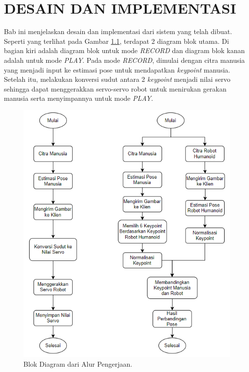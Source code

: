 \chapter{DESAIN DAN IMPLEMENTASI}
\label{chap:design-and-implementation}


Bab ini menjelaskan desain dan implementasi dari sistem yang telah dibuat.
Seperti yang terlihat pada Gambar \ref{fig:block-diagram}, terdapat 2 diagram blok utama. Di bagian kiri adalah diagram blok untuk mode \textit{RECORD} dan diagram blok kanan adalah untuk mode \textit{PLAY}.
Pada mode \textit{RECORD}, dimulai dengan citra manusia yang menjadi input ke estimasi pose untuk mendapatkan \textit{keypoint} manusia.
Setelah itu, melakukan konversi sudut antara 2 \textit{keypoint} menjadi nilai servo sehingga dapat menggerakkan servo-servo robot untuk menirukan gerakan manusia serta menyimpannya untuk mode \textit{PLAY}.
\begin{figure}[ht]
  \centering
  \includegraphics[scale=1.1]{gambar/diagram-block.png}
  \caption{Blok Diagram dari Alur Pengerjaan.}
  \label{fig:block-diagram}
\end{figure}
